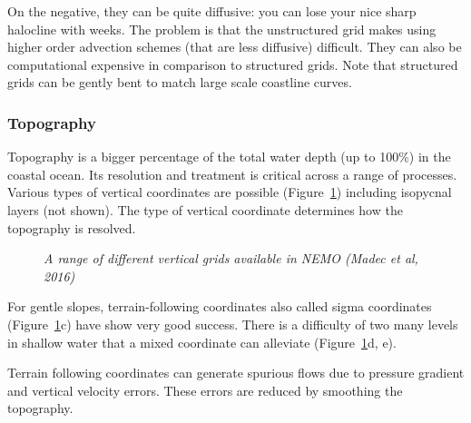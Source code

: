 \documentclass[letterpaper,12pt]{article}
\begin{document}
On the negative, they can be quite diffusive: you can lose your nice sharp halocline with weeks.  The problem is that the unstructured grid makes using higher order advection schemes (that are less diffusive) difficult.  They can also be computational expensive in comparison to structured grids.  Note that structured grids can be gently bent to match large scale coastline curves.

\subsubsection*{Topography}

Topography is a bigger percentage of the total water depth (up to
100\%) in the coastal ocean.  Its resolution and treatment is critical
across a range of processes.  Various types of vertical coordinates
are possible (Figure~\ref{plt:nemobook}) including isopycnal layers
(not shown).  The type of vertical coordinate determines how the topography is resolved.

 \begin{figure}[h]
\caption{\protect\it{\small A range of different vertical grids available in NEMO (Madec et al, 2016)}}
\label{plt:nemobook}
\end{figure}

For gentle slopes, terrain-following coordinates also called sigma
coordinates (Figure~\ref{plt:nemobook}c) have show very good success.
There is a difficulty of two many levels in shallow water that a mixed
coordinate can alleviate (Figure~\ref{plt:nemobook}d, e).

Terrain following coordinates can generate spurious flows due to pressure gradient and vertical velocity errors.  These errors are reduced by smoothing the topography.
\end{document}
